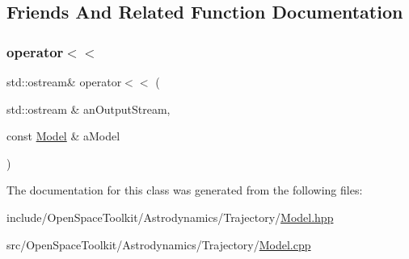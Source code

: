 \subsection{Friends And Related Function Documentation}
\mbox{\label{classostk_1_1astro_1_1trajectory_1_1_model_a68240493d08f91f6613186eb52823e85}} 
\subsubsection{\texorpdfstring{operator$<$$<$}{operator<<}}
{\footnotesize\ttfamily std\+::ostream\& operator$<$$<$ (\begin{DoxyParamCaption}\item[{std\+::ostream \&}]{an\+Output\+Stream,  }\item[{const \hyperlink{classostk_1_1astro_1_1trajectory_1_1_model}{Model} \&}]{a\+Model }\end{DoxyParamCaption})\hspace{0.3cm}{\ttfamily [friend]}}



The documentation for this class was generated from the following files\+:\begin{DoxyCompactItemize}
\item 
include/\+Open\+Space\+Toolkit/\+Astrodynamics/\+Trajectory/\hyperlink{_model_8hpp}{Model.\+hpp}\item 
src/\+Open\+Space\+Toolkit/\+Astrodynamics/\+Trajectory/\hyperlink{_model_8cpp}{Model.\+cpp}\end{DoxyCompactItemize}
